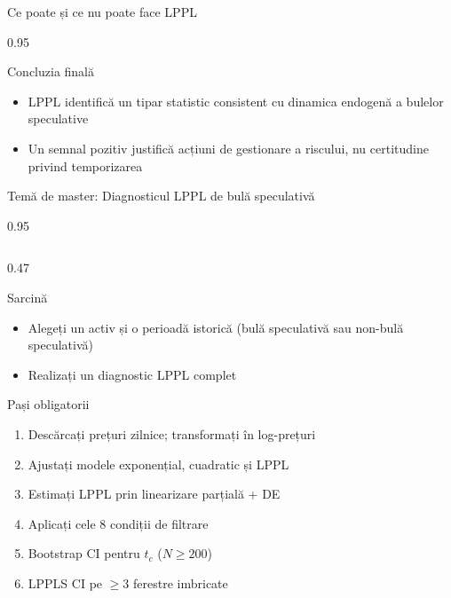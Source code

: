 \documentclass[9pt, aspectratio=169, t]{beamer}
\begin{document}
\begin{frame}{Ce poate și ce nu poate face LPPL}
\begin{cminipage}{0.95\textwidth}
{    \vspace{-1mm}
    \begin{block}{Concluzia finală}
        \begin{itemize}\setlength{\itemsep}{0pt}
            \item LPPL identifică un tipar statistic consistent cu dinamica endogenă a bulelor speculative
            \item Un semnal pozitiv justifică acțiuni de gestionare a riscului, nu certitudine privind temporizarea
        \end{itemize}
    \end{block}
    }
    \end{cminipage}
\end{frame}

\begin{frame}{Temă de master: Diagnosticul LPPL de bulă speculativă}
    \begin{cminipage}{0.95\textwidth}
    {\scriptsize
    \begin{columns}[T]
        \begin{column}{0.47\textwidth}
            \begin{block}{Sarcină}
                \begin{itemize}\setlength{\itemsep}{0pt}
                    \item Alegeți un activ și o perioadă istorică (bulă speculativă sau non-bulă speculativă)
                    \item Realizați un diagnostic LPPL complet
                \end{itemize}
            \end{block}
            \vspace{-2mm}
            \begin{exampleblock}{Pași obligatorii}
                \begin{enumerate}\setlength{\itemsep}{0pt}
                    \item Descărcați prețuri zilnice; transformați în log-prețuri
                    \item Ajustați modele exponențial, cuadratic și LPPL
                    \item Estimați LPPL prin linearizare parțială + DE
                    \item Aplicați cele 8 condiții de filtrare
                    \item Bootstrap CI pentru $t_c$ ($N \geq 200$)
                    \item LPPLS CI pe $\geq 3$ ferestre imbricate

\end{enumerate}
\end{exampleblock}
\end{column}
\end{columns}}
\end{cminipage}
\end{frame}
\end{document}
